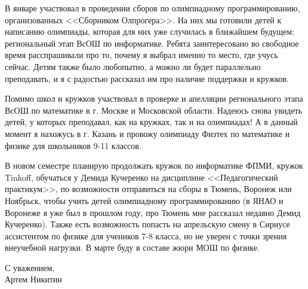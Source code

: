 \quad В январе участвовал в проведении сборов по олимпиадному программированию, организованных <<Сборником Олпрогера>>. На них мы готовили 
детей к написанию олимпиады, которая для них уже случилась в ближайшем будущем: региональный этап ВсОШ по информатике. Ребята заинтересовано во 
свободное время расспрашивали про то, почему я выбрал именно то место, где учусь сейчас. Детям также было любопытно, а можно ли будет 
параллельно преподавать, и я с радостью рассказал им про наличие поддержки и кружков.

\quad Помимо школ и кружков участвовал в проверке и апелляции регионального этапа ВсОШ по математике в г. Москве и Московской области. Надеюсь 
снова увидеть детей, у которых преподавал, как на кружках, так и на олимпиадах! А в данный момент я нахожусь в г. Казань и провожу олимпиаду 
Физтех по математике и физике для школьников 9-11 классов.

\quad В новом семестре планирую продолжать кружок по информатике ФПМИ, кружок Tinkoff, обучаться у Демида Кучеренко на дисциплине 
<<Педагогический практикум>>, по возможности отправиться на сборы в Тюмень, Воронеж или Ноябрьск, чтобы учить детей олимпиадному 
программированию (в ЯНАО и Воронеже я уже был в прошлом году, про Тюмень мне рассказал недавно Демид Кучеренко). Также есть возможность попасть 
на апрельскую смену в Сириусе ассистентом по физике для учеников 7-8 класса, но не уверен с точки зрения внеучебной нагрузки. В марте буду в 
составе жюри МОШ по физике.

\begin{flushright}
    С уважением, \\
    Артем Никитин
\end{flushright}
